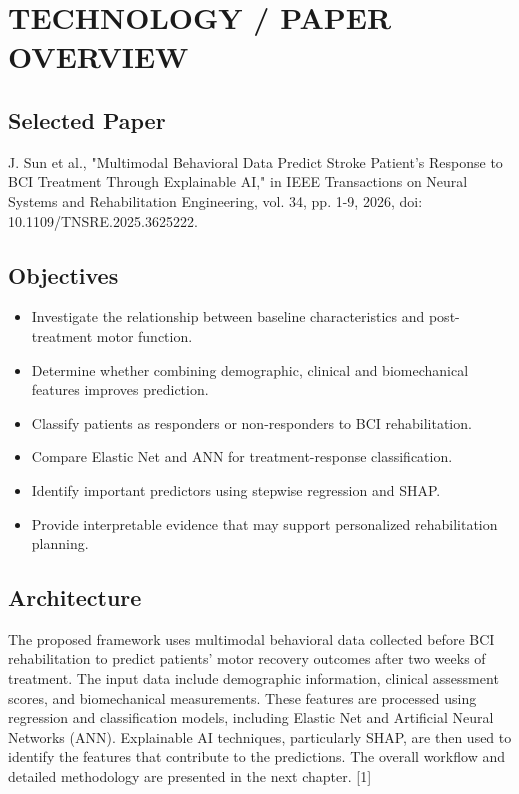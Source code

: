 \chapter{\MakeUppercase{Technology / Paper Overview}}
\setcounter{equation}{0}

\section{Selected Paper}
J. Sun et al., "Multimodal Behavioral Data Predict Stroke Patient’s Response to BCI Treatment Through Explainable AI," in IEEE Transactions on Neural Systems and Rehabilitation Engineering, vol. 34, pp. 1-9, 2026, doi: 10.1109/TNSRE.2025.3625222.\cite{bib1}

\section{Objectives}
\begin{itemize}
    \item Investigate the relationship between baseline characteristics and post-treatment motor function.
    \item Determine whether combining demographic, clinical and biomechanical features improves prediction.
    \item Classify patients as responders or non-responders to BCI rehabilitation.
    \item Compare Elastic Net and ANN for treatment-response classification.
    \item Identify important predictors using stepwise regression and SHAP.
    \item Provide interpretable evidence that may support personalized rehabilitation planning.
\end{itemize}

\section{Architecture}
The proposed framework uses multimodal behavioral data collected before BCI rehabilitation to predict patients’ motor recovery outcomes after two weeks of treatment. The input data include demographic information, clinical assessment scores, and biomechanical measurements. These features are processed using regression and classification models, including Elastic Net and Artificial Neural Networks (ANN). Explainable AI techniques, particularly SHAP, are then used to identify the features that contribute to the predictions. The overall workflow and detailed methodology are presented in the next chapter. [1]
